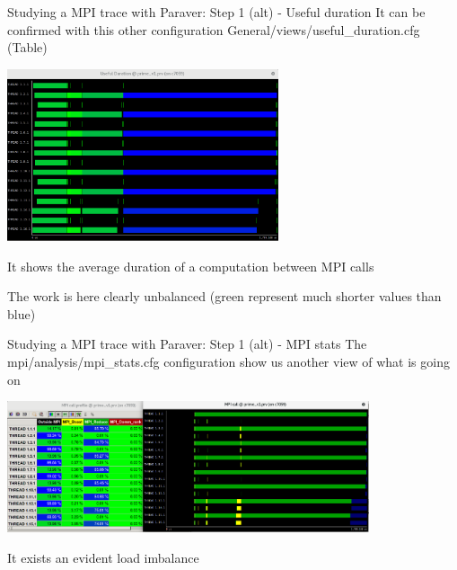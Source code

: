 \documentclass[10pt,xcolor=table]{beamer}
\begin{document}
\begin{frame}{Studying a MPI trace with Paraver: Step 1 (alt) - Useful duration}
It can be confirmed with this other configuration General/views/useful\_duration.cfg (Table)

  \includegraphics[width=0.6\textwidth]{figs/useful_duration_timeline.png}
  
  It shows the average duration of a computation between MPI calls
  
  The work is here clearly unbalanced (green represent much shorter values than blue)

\end{frame}

\begin{frame}{Studying a MPI trace with Paraver: Step 1 (alt) - MPI stats}
The mpi/analysis/mpi\_stats.cfg configuration show us another view of what is going on

  \includegraphics[width=0.8\textwidth]{figs/mpi_stats.png}

    It exists an evident load imbalance
    
\end{frame}
\end{document}
